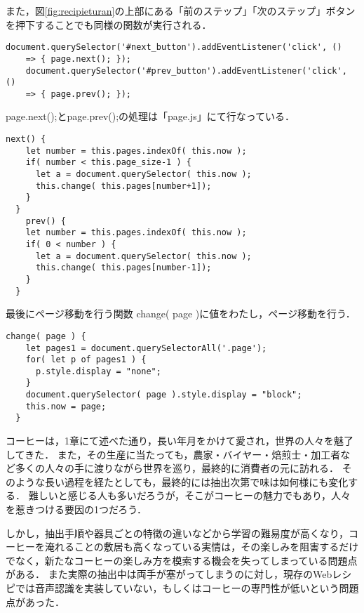 \documentclass[a4j,12pt]{jsarticle}
\makeatletter
\def\section{\@startsection {section}{1}{\z@}{3.5ex plus -1ex minus -.2ex}{2.3 ex plus .2ex}{\Large\bf}}
\makeatother
\begin{document}
また，図\ref{fig:recipieturan}の上部にある「前のステップ」「次のステップ」ボタンを押下することでも同様の関数が実行される．
\begin{lstlisting}[basicstyle=\ttfamily\footnotesize, frame=single]
    document.querySelector('#next_button').addEventListener('click', ()
    => { page.next(); });
    document.querySelector('#prev_button').addEventListener('click', () 
    => { page.prev(); });
 \end{lstlisting}
 
 page.next();とpage.prev();の処理は「page.js」にて行なっている． 
 \begin{lstlisting}[basicstyle=\ttfamily\footnotesize, frame=single]
  next() {
    let number = this.pages.indexOf( this.now );
    if( number < this.page_size-1 ) {
      let a = document.querySelector( this.now );
      this.change( this.pages[number+1]);
    }
  }
    prev() {
    let number = this.pages.indexOf( this.now );
    if( 0 < number ) {
      let a = document.querySelector( this.now );
      this.change( this.pages[number-1]);
    }
  }
 \end{lstlisting}

最後にページ移動を行う関数  change( page )に値をわたし，ページ移動を行う．
 \begin{lstlisting}[basicstyle=\ttfamily\footnotesize, frame=single]
  change( page ) {
    let pages1 = document.querySelectorAll('.page');
    for( let p of pages1 ) {　
      p.style.display = "none";
    }
    document.querySelector( page ).style.display = "block";
    this.now = page;
  }
 \end{lstlisting}






\newpage
\section{\large{結言}}

コーヒーは，1章にて述べた通り，長い年月をかけて愛され，世界の人々を魅了してきた．
また，その生産に当たっても，農家・バイヤー・焙煎士・加工者など多くの人々の手に渡りながら世界を巡り，最終的に消費者の元に訪れる．
そのような長い過程を経たとしても，最終的には抽出次第で味は如何様にも変化する．
難しいと感じる人も多いだろうが，そこがコーヒーの魅力でもあり，人々を惹きつける要因の1つだろう．

しかし，抽出手順や器具ごとの特徴の違いなどから学習の難易度が高くなり，コーヒーを淹れることの敷居も高くなっている実情は，その楽しみを阻害するだけでなく，新たなコーヒーの楽しみ方を模索する機会を失ってしまっている問題点がある．
また実際の抽出中は両手が塞がってしまうのに対し，現存のWebレシピでは音声認識を実装していない，もしくはコーヒーの専門性が低いという問題点があった．
\end{document}
